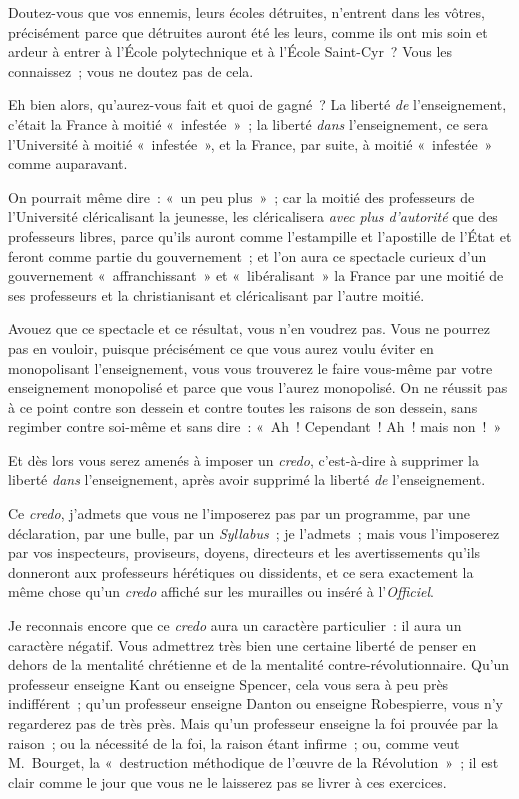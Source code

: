 \documentclass[french,twoside]{book} %
\begin{document}
\noindent Doutez-vous que vos ennemis, leurs écoles détruites, n’entrent dans les vôtres, précisément parce que détruites auront été les leurs, comme ils ont mis soin et ardeur à entrer à l’École polytechnique et à l’École Saint-Cyr ? Vous les connaissez ; vous ne doutez pas de cela.\par
Eh bien alors, qu’aurez-vous fait et quoi de gagné ? La liberté {\itshape de} l’enseignement, c’était la France à moitié « infestée » ; la liberté {\itshape dans} l’enseignement, ce sera l’Université à moitié « infestée », et la France, par suite, à moitié « infestée » comme auparavant.\par
On pourrait même dire : « un peu plus » ; car la moitié des professeurs de l’Université cléricalisant  la jeunesse, les cléricalisera {\itshape avec plus d’autorité} que des professeurs libres, parce qu’ils auront comme l’estampille et l’apostille de l’État et feront comme partie du gouvernement ; et l’on aura ce spectacle curieux d’un gouvernement « affranchissant » et « libéralisant » la France par une moitié de ses professeurs et la christianisant et cléricalisant par l’autre moitié.\par
Avouez que ce spectacle et ce résultat, vous n’en voudrez pas. Vous ne pourrez pas en vouloir, puisque précisément ce que vous aurez voulu éviter en monopolisant l’enseignement, vous vous trouverez le faire vous-même par votre enseignement monopolisé et parce que vous l’aurez monopolisé. On ne réussit pas à ce point contre son dessein et contre toutes les raisons de son dessein, sans regimber contre soi-même et sans dire : « Ah ! Cependant ! Ah ! mais non ! »\par
Et dès lors vous serez amenés à imposer un {\itshape credo}, c’est-à-dire à supprimer la liberté {\itshape dans} l’enseignement, après avoir supprimé la liberté {\itshape de} l’enseignement.\par
Ce {\itshape credo}, j’admets que vous ne l’imposerez pas par un programme, par une déclaration, par une bulle, par un \emph{Syllabus} ; je l’admets ; mais vous l’imposerez par vos inspecteurs, proviseurs, doyens, directeurs et les avertissements qu’ils donneront  aux professeurs hérétiques ou dissidents, et ce sera exactement la même chose qu’un {\itshape credo} affiché sur les murailles ou inséré à l’\emph{Officiel}.\par
Je reconnais encore que ce {\itshape credo} aura un caractère particulier : il aura un caractère négatif. Vous admettrez très bien une certaine liberté de penser en dehors de la mentalité chrétienne et de la mentalité contre-révolutionnaire. Qu’un professeur enseigne Kant ou enseigne Spencer, cela vous sera à peu près indifférent ; qu’un professeur enseigne Danton ou enseigne Robespierre, vous n’y regarderez pas de très près. Mais qu’un professeur enseigne la foi prouvée par la raison ; ou la nécessité de la foi, la raison étant infirme ; ou, comme veut M. Bourget, la « destruction méthodique de l’œuvre de la Révolution » ; il est clair comme le jour que vous ne le laisserez pas se livrer à ces exercices.\par
\end{document}
